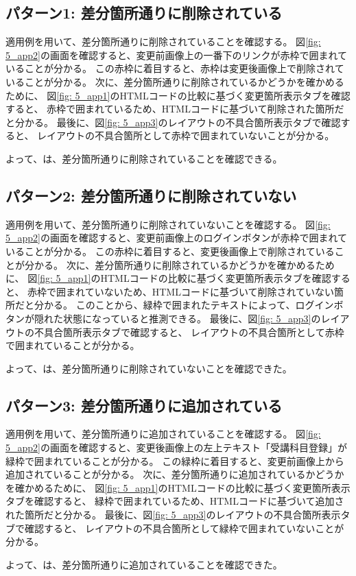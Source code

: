 \subsection{パターン1: 差分箇所通りに削除されている}\label{sec:result_area_detection}
適用例を用いて、差分箇所通りに削除されていることを確認する。
図\ref{fig: 5_app2}の画面を確認すると、変更前画像上の一番下のリンクが赤枠で囲まれていることが分かる。
この赤枠に着目すると、赤枠は変更後画像上で削除されていることが分かる。
次に、差分箇所通りに削除されているかどうかを確かめるために、
図\ref{fig: 5_app1}のHTMLコードの比較に基づく変更箇所表示タブを確認すると、
赤枠で囲まれているため、HTMLコードに基づいて削除された箇所だと分かる。
最後に、図\ref{fig: 5_app3}のレイアウトの不具合箇所表示タブで確認すると、
レイアウトの不具合箇所として赤枠で囲まれていないことが分かる。
\par
よって、\toolName は、差分箇所通りに削除されていることを確認できる。



\subsection{パターン2: 差分箇所通りに削除されていない}\label{sec:result_area2}
適用例を用いて、差分箇所通りに削除されていないことを確認する。
図\ref{fig: 5_app2}の画面を確認すると、変更前画像上のログインボタンが赤枠で囲まれていることが分かる。
この赤枠に着目すると、変更後画像上で削除されていることが分かる。
次に、差分箇所通りに削除されているかどうかを確かめるために、
図\ref{fig: 5_app1}のHTMLコードの比較に基づく変更箇所表示タブを確認すると、
赤枠で囲まれていないため、HTMLコードに基づいて削除されていない箇所だと分かる。
このことから、緑枠で囲まれたテキストによって、ログインボタンが隠れた状態になっていると推測できる。
最後に、図\ref{fig: 5_app3}のレイアウトの不具合箇所表示タブで確認すると、
レイアウトの不具合箇所として赤枠で囲まれていることが分かる。
\par
よって、\toolName は、差分箇所通りに削除されていないことを確認できた。


\subsection{パターン3: 差分箇所通りに追加されている}\label{sec:result_area3}
適用例を用いて、差分箇所通りに追加されていることを確認する。
図\ref{fig: 5_app2}の画面を確認すると、変更後画像上の左上テキスト「受講科目登録」が緑枠で囲まれていることが分かる。
この緑枠に着目すると、変更前画像上から追加されていることが分かる。
次に、差分箇所通りに追加されているかどうかを確かめるために、
図\ref{fig: 5_app1}のHTMLコードの比較に基づく変更箇所表示タブを確認すると、
緑枠で囲まれているため、HTMLコードに基づいて追加された箇所だと分かる。
最後に、図\ref{fig: 5_app3}のレイアウトの不具合箇所表示タブで確認すると、
レイアウトの不具合箇所として緑枠で囲まれていないことが分かる。
\par
よって、\toolName は、差分箇所通りに追加されていることを確認できた。


